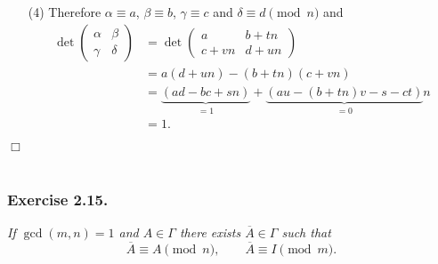 \documentclass{article}
\begin{document}
\begin{enumerate}
\item[(4)]
  Therefore
  $\alpha \equiv a$, $\beta \equiv b$, $\gamma \equiv c$ and $\delta \equiv d \pmod{n}$
  and
  \begin{align*}
    \det
    \begin{pmatrix}
      \alpha & \beta \\
      \gamma & \delta
    \end{pmatrix}
    &=
    \det
    \begin{pmatrix}
      a & b + tn \\
      c + vn & d + un
    \end{pmatrix} \\
    &=
    a(d+un) - (b+tn)(c+vn) \\
    &=
    \underbrace{(ad - bc + sn)}_{= 1}
      + \underbrace{(au - (b+tn)v - s - ct)}_{= 0}n \\
    &= 1.
  \end{align*}
\end{enumerate}
$\Box$ \\\\






\subsubsection*{Exercise 2.15.}
\emph{If $\gcd(m,n) = 1$ and $A \in \Gamma$ there exists $\overline{A} \in \Gamma$
such that}
\[
  \overline{A} \equiv A \pmod{n},
  \qquad
  \overline{A} \equiv I \pmod{m}.
\] \\
\end{document}
